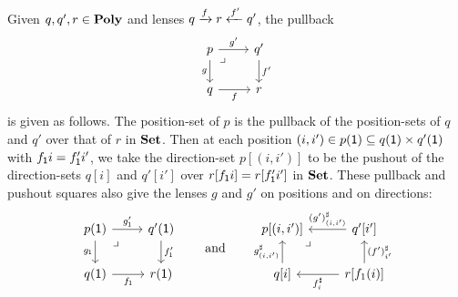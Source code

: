 \documentclass[Book-Poly]{subfiles}
\begin{document}
\begin{example}\label{ex.pullbacks_in_poly}
Given $q,q',r \in \mathbf{Poly}$ and lenses $q\xrightarrow{f} r\xleftarrow{f'} q'$, the pullback
\[
\begin{tikzcd}
	p\ar[r, "g'"]\ar[d, "g"']&
	q'\ar[d, "f'"]\\
	q\ar[r, "f"']&
	r\ar[ul, phantom, very near end, "\lrcorner"]
\end{tikzcd}
\]
is given as follows.
The position-set of $p$ is the pullback of the position-sets of $q$ and $q'$ over that of $r$ in $\mathbf{Set}$.
Then at each position $(i, i') \in p(\textsf{1}) \subseteq q(\textsf{1}) \times q'(\textsf{1})$ with $f_{\textsf{1}}i=f'_{\textsf{1}}i'$, we take the direction-set $p[(i, i')]$ to be the pushout of the direction-sets $q[i]$ and $q'[i']$ over $r[f_{\textsf{1}}i]=r[f_{\textsf{1}}'i']$ in $\mathbf{Set}$.
These pullback and pushout squares also give the lenses $g$ and $g'$ on positions and on directions:
\begin{equation}\label{eqn.pullback_poly}
\begin{tikzcd}
	p(\1)\ar[r, "g'_\1"]\ar[d, "g_\1"']&
	q'(\1)\ar[d, "f_\1'"]\\
	q(\1)\ar[r, "f_\1"']&
	r(\1)\ar[ul, phantom, very near end, "\lrcorner"]
\end{tikzcd}
\qqand
\begin{tikzcd}
	p[(i,i')]\ar[from=r, "(g')^\sharp_{(i,i')}"']\ar[from=d, "g^\sharp_{(i,i')}"]&
	q'[i']\ar[from=d, "(f')^\sharp_{i'}"']\\
	q[i]\ar[from=r, "f^\sharp_i"]&
	r[f_1(i)]\ar[ul, phantom, very near end, "\lrcorner"]
\end{tikzcd}
\end{equation}
\end{example}
\end{document}
